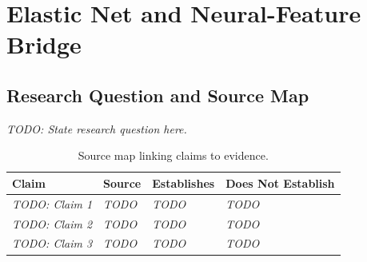 \section{Elastic Net and Neural-Feature Bridge}
\label{sec:elastic-net}

\subsection{Research Question and Source Map}
\label{sec:research-question}

%

\textit{TODO: State research question here.}

\begin{table}[H]
\centering
\caption{Source map linking claims to evidence.}
\label{tab:source-map}
\begin{tabularx}{\textwidth}{X l X X}
\toprule
\textbf{Claim} &
\textbf{Source} &
\textbf{Establishes} &
\textbf{Does Not Establish} \\
\midrule
%
%
\textit{TODO: Claim 1} & \textit{TODO} & \textit{TODO} & \textit{TODO} \\[4pt]
\textit{TODO: Claim 2} & \textit{TODO} & \textit{TODO} & \textit{TODO} \\[4pt]
\textit{TODO: Claim 3} & \textit{TODO} & \textit{TODO} & \textit{TODO} \\
\bottomrule
\end{tabularx}
\end{table}

